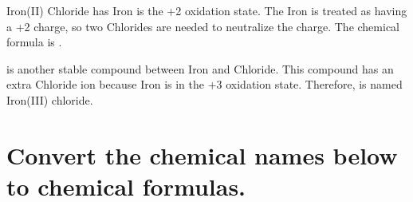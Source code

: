 \documentclass[12pt, oneside, letterpaper]{book}
\begin{document}
Iron(II) Chloride has Iron is the +2 oxidation state. The Iron is treated as having a +2 charge, so two Chlorides are needed to neutralize the charge. The chemical formula is .

 is another stable compound between Iron and Chloride. This compound has an extra Chloride ion because Iron is in the +3 oxidation state. Therefore,  is named Iron(III) chloride.  

\newpage

\section{Convert the chemical names below to chemical formulas.}
\vspace{5mm}


\vspace{17mm}

\vspace{17mm}

\vspace{17mm}

\vspace{17mm}

\vspace{17mm}

\vspace{17mm}



\vspace{17mm}

\vspace{17mm}

\vspace{17mm}

\vspace{17mm}

\vspace{17mm}

\vspace{17mm}

\vspace{17mm}
\end{document}
